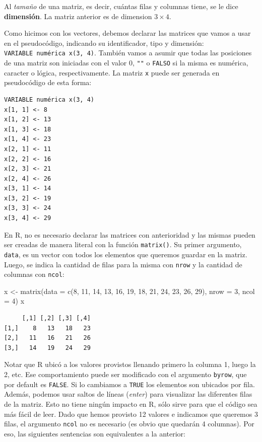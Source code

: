 \documentclass[
]{book}
\newenvironment{Shaded}{\begin{snugshade}}{\end{snugshade}}
\newcommand{\AttributeTok}[1]{\textcolor[rgb]{0.77,0.63,0.00}{#1}}
\newcommand{\DecValTok}[1]{\textcolor[rgb]{0.00,0.00,0.81}{#1}}
\newcommand{\FunctionTok}[1]{\textcolor[rgb]{0.00,0.00,0.00}{#1}}
\newcommand{\NormalTok}[1]{#1}
\newcommand{\OtherTok}[1]{\textcolor[rgb]{0.56,0.35,0.01}{#1}}
\begin{document}
Al \emph{tamaño} de una matriz, es decir, cuántas filas y columnas tiene, se le dice \textbf{dimensión}. La matriz anterior es de dimension \(3 \times 4\).

Como hicimos con los vectores, debemos declarar las matrices que vamos a usar en el pseudocódigo, indicando su identificador, tipo y dimensión: \texttt{VARIABLE\ numérica\ x(3,\ 4)}. También vamos a asumir que todas las posiciones de una matriz son iniciadas con el valor 0, \texttt{""} o \texttt{FALSO} si la misma es numérica, caracter o lógica, respectivamente. La matriz \texttt{x} puede ser generada en pseudocódigo de esta forma:

\begin{verbatim}
VARIABLE numérica x(3, 4)
x[1, 1] <- 8
x[1, 2] <- 13
x[1, 3] <- 18
x[1, 4] <- 23
x[2, 1] <- 11
x[2, 2] <- 16
x[2, 3] <- 21
x[2, 4] <- 26
x[3, 1] <- 14
x[3, 2] <- 19
x[3, 3] <- 24
x[3, 4] <- 29
\end{verbatim}

En R, no es necesario declarar las matrices con anterioridad y las mismas pueden ser creadas de manera literal con la función \texttt{matrix()}. Su primer argumento, \texttt{data}, es un vector con todos los elementos que queremos guardar en la matriz. Luego, se indica la cantidad de filas para la misma con \texttt{nrow} y la cantidad de columnas con \texttt{ncol}:

\begin{Shaded}
\begin{Highlighting}[]
\NormalTok{x }\OtherTok{\textless{}{-}} \FunctionTok{matrix}\NormalTok{(}\AttributeTok{data =} \FunctionTok{c}\NormalTok{(}\DecValTok{8}\NormalTok{, }\DecValTok{11}\NormalTok{, }\DecValTok{14}\NormalTok{, }\DecValTok{13}\NormalTok{, }\DecValTok{16}\NormalTok{, }\DecValTok{19}\NormalTok{, }\DecValTok{18}\NormalTok{, }\DecValTok{21}\NormalTok{, }\DecValTok{24}\NormalTok{, }\DecValTok{23}\NormalTok{, }\DecValTok{26}\NormalTok{, }\DecValTok{29}\NormalTok{),}
            \AttributeTok{nrow =} \DecValTok{3}\NormalTok{, }\AttributeTok{ncol =} \DecValTok{4}\NormalTok{)}
\NormalTok{x}
\end{Highlighting}
\end{Shaded}

\begin{verbatim}
     [,1] [,2] [,3] [,4]
[1,]    8   13   18   23
[2,]   11   16   21   26
[3,]   14   19   24   29
\end{verbatim}

Notar que R ubicó a los valores provistos llenando primero la columna 1, luego la 2, etc. Ese comportamiento puede ser modificado con el argumento \texttt{byrow}, que por default es \texttt{FALSE}. Si lo cambiamos a \texttt{TRUE} los elementos son ubicados por fila. Además, podemos usar saltos de líneas (\emph{enter}) para visualizar las diferentes filas de la matriz. Esto no tiene ningún impacto en R, sólo sirve para que el código sea más fácil de leer. Dado que hemos provisto 12 valores e indicamos que queremos 3 filas, el argumento \texttt{ncol} no es necesario (es obvio que quedarán 4 columnas). Por eso, las siguientes sentencias son equivalentes a la anterior:
\end{document}
